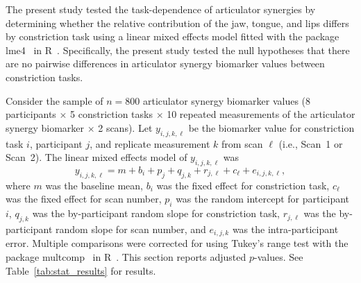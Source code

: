 \documentclass[preprint]{JASAnew}\usepackage[]{graphicx}\usepackage[]{color}
\begin{document}
The present study tested the task-dependence of articulator synergies by determining whether the relative contribution of the jaw, tongue, and lips differs by constriction task using a linear mixed effects model fitted with the package lme4~\citep{bates2015fitting} in R~\citep{r2017language}. Specifically, the present study tested the null hypotheses that there are no pairwise differences in articulator synergy biomarker values between constriction tasks.

Consider the sample of $n=800$ articulator synergy biomarker values (\num{8} participants $\times$ \num{5} constriction tasks $\times$ \num{10} repeated measurements of the articulator synergy biomarker $\times$ \num{2} scans). Let $y_{i,j,k,\ell}$ be the biomarker value for constriction task $i$, participant $j$, and replicate measurement $k$ from scan $\ell$ (i.e., Scan~\num{1} or Scan~\num{2}). The linear mixed effects model of $y_{i,j,k,\ell}$ was 
%
\begin{equation}
\label{eq:lmm}
y_{i,j,k,\ell} = m + b_i + p_j + q_{j,k} + r_{j,\ell} + c_\ell + e_{i,j,k,\ell},
\end{equation}
%
where $m$ was the baseline mean, $b_i$ was the fixed effect for constriction task, $c_\ell$ was the fixed effect for scan number, $p_i$ was the random intercept for participant $i$, $q_{j,k}$ was the by-participant random slope for constriction task, $r_{j,\ell}$ was the by-participant random slope for scan number, and $e_{i,j,k}$ was the intra-participant error. Multiple comparisons were corrected for using Tukey's range test with the package multcomp~\citep{hothorn2008simultaneous} in R~\citep{r2017language}. This section reports adjusted $p$-values. See Table~\ref{tab:stat_results} for results.
\end{document}

